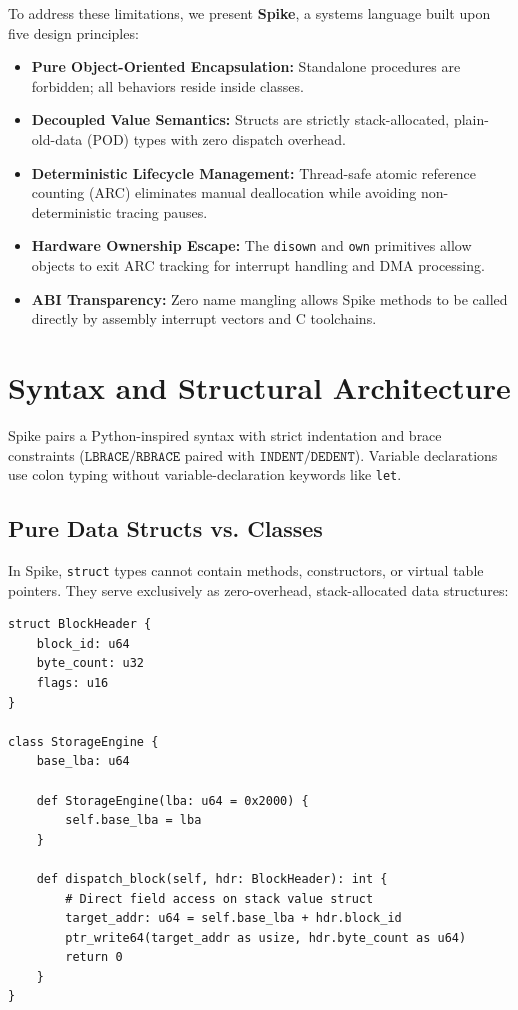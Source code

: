 \documentclass[10pt,twocolumn]{article}
\begin{document}
To address these limitations, we present \textbf{Spike}, a systems language built upon five design principles:
\begin{itemize}
    \item \textbf{Pure Object-Oriented Encapsulation:} Standalone procedures are forbidden; all behaviors reside inside classes.
    \item \textbf{Decoupled Value Semantics:} Structs are strictly stack-allocated, plain-old-data (POD) types with zero dispatch overhead.
    \item \textbf{Deterministic Lifecycle Management:} Thread-safe atomic reference counting (ARC) eliminates manual deallocation while avoiding non-deterministic tracing pauses.
    \item \textbf{Hardware Ownership Escape:} The \texttt{disown} and \texttt{own} primitives allow objects to exit ARC tracking for interrupt handling and DMA processing.
    \item \textbf{ABI Transparency:} Zero name mangling allows Spike methods to be called directly by assembly interrupt vectors and C toolchains.
\end{itemize}

\section{Syntax and Structural Architecture}

Spike pairs a Python-inspired syntax with strict indentation and brace constraints ($\mathtt{LBRACE}/\mathtt{RBRACE}$ paired with $\mathtt{INDENT}/\mathtt{DEDENT}$). Variable declarations use colon typing without variable-declaration keywords like \texttt{let}.

\subsection{Pure Data Structs vs. Classes}
In Spike, \texttt{struct} types cannot contain methods, constructors, or virtual table pointers. They serve exclusively as zero-overhead, stack-allocated data structures:

\begin{lstlisting}[caption={Pure Data Struct and Behavioral Class Encapsulation}]
struct BlockHeader {
    block_id: u64
    byte_count: u32
    flags: u16
}

class StorageEngine {
    base_lba: u64

    def StorageEngine(lba: u64 = 0x2000) {
        self.base_lba = lba
    }

    def dispatch_block(self, hdr: BlockHeader): int {
        # Direct field access on stack value struct
        target_addr: u64 = self.base_lba + hdr.block_id
        ptr_write64(target_addr as usize, hdr.byte_count as u64)
        return 0
    }
}
\end{lstlisting}
\end{document}
